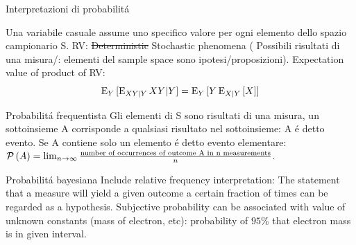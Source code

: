 \documentclass[asd-beamer.tex]{subfiles}
\begin{document}
\begin{frame}{Interpretazioni di probabilit\'a}
\begin{block}{Una variabile casuale assume uno specifico valore per ogni elemento dello spazio campionario S.}
RV: \sout{Deterministic} Stochastic phenomena ( Possibili risultati di una misura/: elementi del sample space sono ipotesi/proposizioni). Expectation value of product of RV:%
\[\operatorname{E}_Y{[\operatorname{E}_{XY|Y}{XY|Y}]}=\operatorname{E}_Y{[Y\operatorname{E}_{X|Y}{[X]}]}\]
\end{block}
\begin{block}{Probabilit\'a frequentista}
Gli elementi di S sono risultati di una misura, un sottoinsieme A corrisponde a qualsiasi risultato nel sottoinsieme: A \'e detto evento. Se A contiene solo un elemento \'e detto evento elementare: $\operatorname{\mathcal{P}}{(A)}=\lim_{n\to\infty}\frac{\text{number of occurrences of outcome A in n measurements}}{n}$.
\end{block}
\begin{block}{Probabilit\'a bayesiana}
Include relative frequency interpretation: The statement that a measure will yield a given outcome a certain fraction of times can be regarded as a hypothesis.
Subjective probability can be associated with value of unknown constants (mass of electron, etc): probability of $95\%$ that electron mass is in given interval.
\end{block}
\end{frame}
\end{document}
